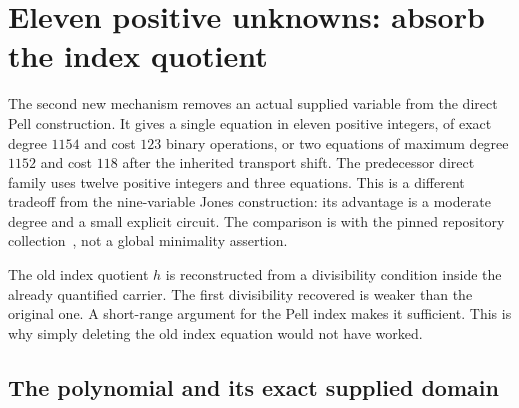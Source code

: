 \section{Eleven positive unknowns: absorb the index quotient}
\label{sec:eleven}

The second new mechanism removes an actual supplied variable from the direct
Pell construction. It gives a single equation in eleven positive integers,
of exact degree $1154$ and cost $123$ binary operations, or two equations of
maximum degree $1152$ and cost $118$ after the inherited transport shift.
The predecessor direct family uses twelve positive integers and three
equations. This is a different tradeoff from the nine-variable Jones
construction: its advantage is a moderate degree and a small explicit circuit.
The comparison is with the pinned repository collection~\cite{repo}, not a
global minimality assertion.

The old index quotient $h$ is reconstructed from a divisibility condition
inside the already quantified carrier. The first divisibility recovered is
weaker than the original one. A short-range argument for the Pell index makes
it sufficient. This is why simply deleting the old index equation would not
have worked.

\subsection{The polynomial and its exact supplied domain}

